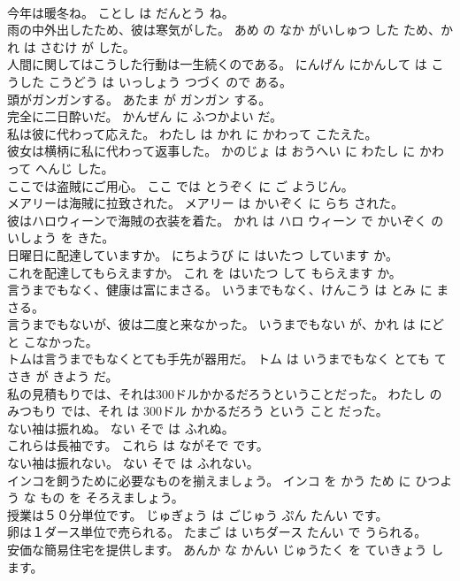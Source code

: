 \documentclass[8pt]{extreport}
\begin{document}
\begin{CJK}{UTF8}{min}
\\	今年は暖冬ね。	ことし は だんとう ね。	
\\	雨の中外出したため、彼は寒気がした。	あめ の なか がいしゅつ した ため、かれ は さむけ が した。	
\\	人間に関してはこうした行動は一生続くのである。	にんげん にかんして は こうした こうどう は いっしょう つづく ので ある。	
\\	頭がガンガンする。	あたま が ガンガン する。	
\\	完全に二日酔いだ。	かんぜん に ふつかよい だ。	
\\	私は彼に代わって応えた。	わたし は かれ に かわって こたえた。	
\\	彼女は横柄に私に代わって返事した。	かのじょ は おうへい に わたし に かわって へんじ した。	
\\	ここでは盗賊にご用心。	ここ では とうぞく に ご ようじん。	
\\	メアリーは海賊に拉致された。	メアリー は かいぞく に らち された。	
\\	彼はハロウィーンで海賊の衣装を着た。	かれ は ハロ ウィーン で かいぞく の いしょう を きた。	
\\	日曜日に配達していますか。	にちようび に はいたつ しています か。	
\\	これを配達してもらえますか。	これ を はいたつ して もらえます か。	
\\	言うまでもなく、健康は富にまさる。	いうまでもなく、けんこう は とみ に まさる。	
\\	言うまでもないが、彼は二度と来なかった。	いうまでもない が、かれ は にど と こなかった。	
\\	トムは言うまでもなくとても手先が器用だ。	トム は いうまでもなく とても てさき が きよう だ。	
\\	私の見積もりでは、それは300ドルかかるだろうということだった。	わたし の みつもり では、それ は 300ドル かかるだろう という こと だった。	
\\	ない袖は振れぬ。	ない そで は ふれぬ。	
\\	これらは長袖です。	これら は ながそで です。	
\\	ない袖は振れない。	ない そで は ふれない。	
\\	インコを飼うために必要なものを揃えましょう。	インコ を かう ため に ひつよう な もの を そろえましょう。	
\\	授業は５０分単位です。	じゅぎょう は ごじゅう ぷん たんい です。	
\\	卵は１ダース単位で売られる。	たまご は いちダース たんい で うられる。	
\\	安価な簡易住宅を提供します。	あんか な かんい じゅうたく を ていきょう します。	

\end{CJK}
\end{document}
